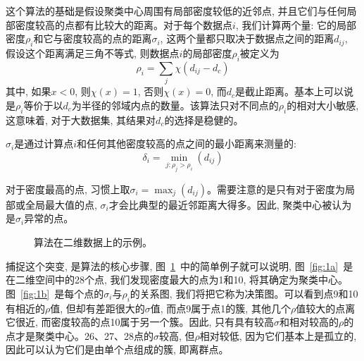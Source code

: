 这个算法的基础是假设聚类中心周围有局部密度较低的近邻点, 并且它们与任何局部密度较高的点都有比较大的距离。对于每个数据点$i$, 我们计算两个量: 它的局部密度$\rho_i$和它与密度较高的点的距离$\sigma_i$, 这两个量都只取决于数据点之间的距离$d_{ij}$, 假设这个距离满足三角不等式, 则数据点$i$的局部密度$\rho_i$被定义为
\begin{equation}
    \rho_i=\sum_{j}\chi (d_{ij}-d_c)
    \label{equ:1}
\end{equation}
其中, 如果$x<0$, 则$\chi(x)=1$, 否则$\chi(x)=0$, 而$d_c$是截止距离。基本上可以说是$\rho_i$等价于以$d_c$为半径的邻域内点的数量。该算法只对不同点的$\rho_i$的相对大小敏感, 这意味着, 对于大数据集, 其结果对$d_c$的选择是稳健的。

$\sigma_i$是通过计算点$i$和任何其他密度较高的点之间的最小距离来测量的: 
\begin{equation}
\delta_{i}=\min _{j: \rho_{j}>\rho_{i}}\left(d_{i j}\right)
\label{equ:2}
\end{equation}

对于密度最高的点, 习惯上取$\sigma_i = \max_j(d_{ij})$。需要注意的是只有对于密度为局部或全局最大值的点, $\sigma_i$才会比典型的最近邻距离大得多。因此, 聚类中心被认为是$\sigma_i$异常的点。
\begin{figure}[ht]
    \centering
    \caption{算法在二维数据上的示例。\label{fig:1}}
\end{figure}

捕捉这个突变, 是算法的核心步骤, 图~\ref{fig:1}~中的简单例子就可以说明, 图~\ref{fig:1a}~是在二维空间中的28个点, 我们发现密度最大的点为1和10, 将其确定为聚类中心。图~\ref{fig:1b}~是每个点的$\sigma_i$与$\rho_i$的关系图, 我们将把它称为决策图。可以看到点9和10有相近的$\rho$值, 但却有差距很大的$\sigma$值, 而点9属于点1的簇, 其他几个$\rho$值较大的点离它很近, 而密度较高的点10属于另一个簇。因此, 只有具有较高$\sigma$和相对较高的$\rho$的点才是聚类中心。26、27、28点的$\sigma$较高, 但$\rho$相对较低, 因为它们基本上是孤立的, 因此可以认为它们是由单个点组成的簇, 即离群点。

